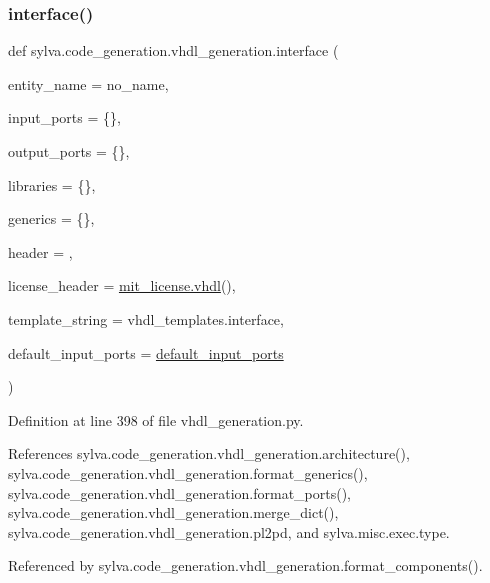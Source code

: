 \subsubsection{\texorpdfstring{interface()}{interface()}}
{\footnotesize\ttfamily def sylva.\+code\+\_\+generation.\+vhdl\+\_\+generation.\+interface (\begin{DoxyParamCaption}\item[{}]{entity\+\_\+name = {\ttfamily \textquotesingle{}no\+\_\+name\textquotesingle{}},  }\item[{}]{input\+\_\+ports = {\ttfamily \{\}},  }\item[{}]{output\+\_\+ports = {\ttfamily \{\}},  }\item[{}]{libraries = {\ttfamily \{\}},  }\item[{}]{generics = {\ttfamily \{\}},  }\item[{}]{header = {\ttfamily \textquotesingle{}\textquotesingle{}},  }\item[{}]{license\+\_\+header = {\ttfamily \hyperlink{namespacesylva_1_1code__generation_1_1mit__license_a5c8d9ae3b2d4db392cdc66e37b035675}{mit\+\_\+license.\+vhdl}()},  }\item[{}]{template\+\_\+string = {\ttfamily vhdl\+\_\+templates.interface},  }\item[{}]{default\+\_\+input\+\_\+ports = {\ttfamily \hyperlink{namespacesylva_1_1code__generation_1_1vhdl__generation_a0cf71880063e2c29029ca74b630eec28}{default\+\_\+input\+\_\+ports}} }\end{DoxyParamCaption})}



Definition at line 398 of file vhdl\+\_\+generation.\+py.



References sylva.\+code\+\_\+generation.\+vhdl\+\_\+generation.\+architecture(), sylva.\+code\+\_\+generation.\+vhdl\+\_\+generation.\+format\+\_\+generics(), sylva.\+code\+\_\+generation.\+vhdl\+\_\+generation.\+format\+\_\+ports(), sylva.\+code\+\_\+generation.\+vhdl\+\_\+generation.\+merge\+\_\+dict(), sylva.\+code\+\_\+generation.\+vhdl\+\_\+generation.\+pl2pd, and sylva.\+misc.\+exec.\+type.



Referenced by sylva.\+code\+\_\+generation.\+vhdl\+\_\+generation.\+format\+\_\+components().


